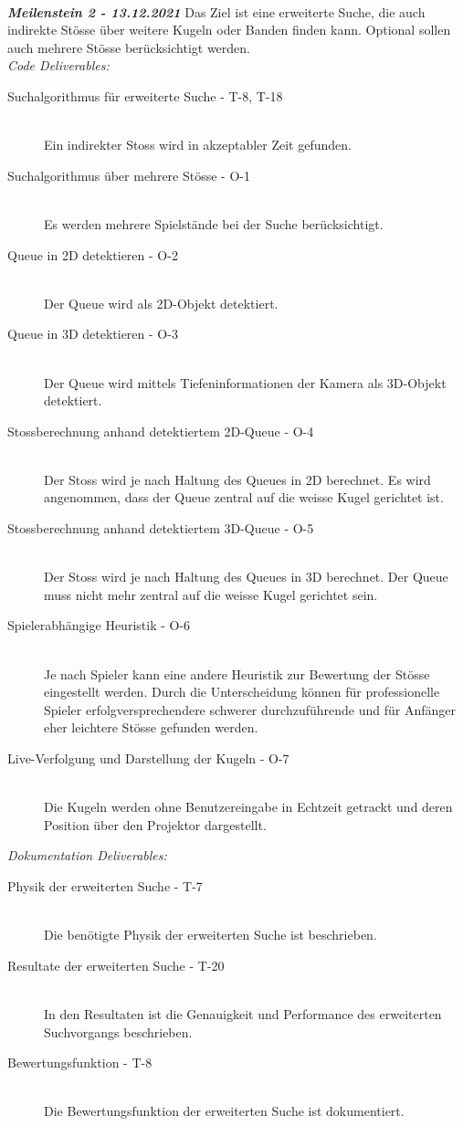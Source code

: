 ~\\

\textit{\textbf{Meilenstein 2 - 13.12.2021}}
Das Ziel ist eine erweiterte Suche, die auch indirekte Stösse über weitere Kugeln oder Banden finden kann.
Optional sollen auch mehrere Stösse berücksichtigt werden.\\
\textit{Code Deliverables:}
\begin{description}
    \item[Suchalgorithmus für erweiterte Suche - T-8, T-18]\hfill \\
    Ein indirekter Stoss wird in akzeptabler Zeit gefunden.
    \item[Suchalgorithmus über mehrere Stösse - O-1]\hfill \\
    Es werden mehrere Spielstände bei der Suche berücksichtigt.
    \item[Queue in 2D detektieren - O-2]\hfill \\
    Der Queue wird als 2D-Objekt detektiert.
    \item[Queue in 3D detektieren - O-3]\hfill \\
    Der Queue wird mittels Tiefeninformationen der Kamera als 3D-Objekt detektiert.
    \item[Stossberechnung anhand detektiertem 2D-Queue - O-4]\hfill \\
    Der Stoss wird je nach Haltung des Queues in 2D berechnet. Es wird angenommen, dass der Queue zentral auf die
    weisse Kugel gerichtet ist.
    \item[Stossberechnung anhand detektiertem 3D-Queue - O-5]\hfill \\
    Der Stoss wird je nach Haltung des Queues in 3D berechnet. Der Queue muss nicht mehr zentral auf die weisse
    Kugel gerichtet sein.
    \item[Spielerabhängige Heuristik - O-6]\hfill \\
    Je nach Spieler kann eine andere Heuristik zur Bewertung der Stösse eingestellt werden. Durch die Unterscheidung
    können für professionelle Spieler erfolgversprechendere schwerer durchzuführende und für Anfänger
    eher leichtere Stösse gefunden werden.
    \item[Live-Verfolgung und Darstellung der Kugeln - O-7]\hfill \\
    Die Kugeln werden ohne Benutzereingabe in Echtzeit getrackt und deren Position über den Projektor dargestellt.
\end{description}
\textit{Dokumentation Deliverables:}
\begin{description}
    \item[Physik der erweiterten Suche - T-7]\hfill \\
    Die benötigte Physik der erweiterten Suche ist beschrieben.
    \item[Resultate der erweiterten Suche - T-20]\hfill \\
    In den Resultaten ist die Genauigkeit und Performance des erweiterten Suchvorgangs
    beschrieben.
    \item[Bewertungsfunktion - T-8]\hfill \\
    Die Bewertungsfunktion der erweiterten Suche ist dokumentiert.
\end{description}

